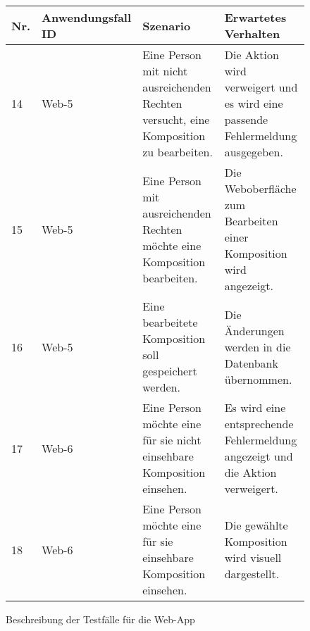 \newpage
\begin{figure}[!h]
	\begin{center}
	\begin{tabularx}{\textwidth}{ p{} | p{} | X | X }
		\textbf{Nr.} & \textbf{Anwendungsfall ID} & \textbf{Szenario} & \textbf{Erwartetes Verhalten} \\ \hline


			14 & Web-5 & Eine Person mit nicht ausreichenden Rechten versucht, eine Komposition zu bearbeiten. & Die Aktion wird verweigert und es wird eine passende Fehlermeldung ausgegeben. \\ \hline
			15 & Web-5 & Eine Person mit ausreichenden Rechten möchte eine Komposition bearbeiten. & Die Weboberfläche zum Bearbeiten einer Komposition wird angezeigt. \\ \hline
			16 & Web-5 & Eine bearbeitete Komposition soll gespeichert werden. & Die Änderungen werden in die Datenbank übernommen. \\ \hline
			17 & Web-6 & Eine Person möchte eine für sie nicht einsehbare Komposition einsehen. & Es wird eine entsprechende Fehlermeldung angezeigt und die Aktion verweigert. \\ \hline
			18 & Web-6 & Eine Person möchte eine für sie einsehbare Komposition einsehen. & Die gewählte Komposition wird visuell dargestellt. \\ \hline
			
		\end{tabularx}	

	\end{center}
	

	\caption{Beschreibung der Testfälle für die Web-App}
	\label{fig:testfaelle-webapp}
\end{figure}

